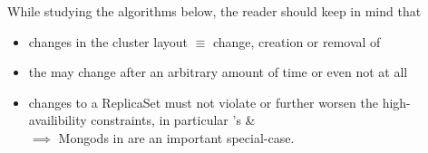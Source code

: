 While studying the algorithms below, the reader should keep in mind that
\begin{itemize}
  \item changes in the cluster layout $\equiv$ change, creation or removal of 
  \item the  may change after an arbitrary amount of time or even not at all
  \item changes to a ReplicaSet must not violate or further worsen the high-availibility constraints,
        in particular 's  \& \\
        $\implies$ Mongods in  are an important special-case.
\end{itemize}


